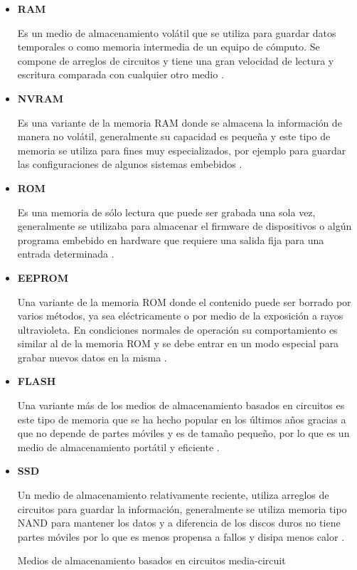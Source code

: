 \begin{itemize}

  \item \textbf{RAM}

Es un medio de almacenamiento vol\'{a}til que se utiliza para guardar datos temporales o como memoria intermedia de un equipo de c\'{o}mputo. Se compone de arreglos de circuitos y tiene una gran velocidad de lectura y escritura comparada con cualquier otro medio \cite{_rom_????}.

  \item \textbf{NVRAM}

Es una variante de la memoria \textsc{RAM} donde se almacena la informaci\'{o}n de manera no vol\'{a}til, generalmente su capacidad es peque\~{n}a y este tipo de memoria se utiliza para fines muy especializados, por ejemplo para guardar las configuraciones de algunos sistemas embebidos \cite{veenstra_random_1986}.

  \item \textbf{ROM}

Es una memoria de s\'{o}lo lectura que puede ser grabada una sola vez, generalmente se utilizaba para almacenar el firmware de dispositivos o alg\'{u}n programa embebido en hardware que requiere una salida fija para una entrada determinada \cite{_rom_????}.

  \item \textbf{EEPROM}

Una variante de la memoria \textsc{ROM} donde el contenido puede ser borrado por varios m\'{e}todos, ya sea el\'{e}ctricamente o por medio de la exposici\'{o}n a rayos ultravioleta. En condiciones normales de operaci\'{o}n su comportamiento es similar al de la memoria \textsc{ROM} y se debe entrar en un modo especial para grabar nuevos datos en la misma \cite{_rom_????-1}.

  \item \textbf{FLASH}

Una variante m\'{a}s de los medios de almacenamiento basados en circuitos es este tipo de memoria que se ha hecho popular en los \'{u}ltimos a\~{n}os gracias a que no depende de partes m\'{o}viles y es de tama\~{n}o peque\~{n}o, por lo que es un medio de almacenamiento port\'{a}til y eficiente \cite{_flashmemguide.pdf_????}.

  \item \textbf{SSD}

Un medio de almacenamiento relativamente reciente, utiliza arreglos de circuitos para guardar la informaci\'{o}n, generalmente se utiliza memoria tipo \textsc{NAND} para mantener los datos y a diferencia de los discos duros no tiene partes m\'{o}viles por lo que es menos propensa a fallos y disipa menos calor \cite{_ssd-faq-us.pdf_????}.

\diagramblock
{Medios de almacenamiento basados en circuitos}
{media-circuit}
{
 {
  
 }
}

\end{itemize}

